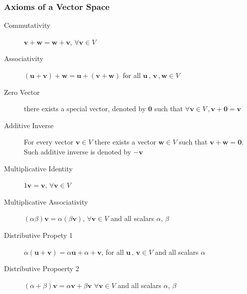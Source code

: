 \documentclass[12pt letter]{report}
\begin{document}
\subsubsection{Axioms of a Vector Space}

\begin{description}
  \item[Commutativity] $\mathbf{v} + \mathbf{w} = \mathbf{w} + \mathbf{v} $, $\forall \mathbf{v} \in V$
  \item[Associativity] $\left( \mathbf{u} + \mathbf{v} \right) + \mathbf{w} = \mathbf{u} + \left( \mathbf{v} +
          \mathbf{w}  \right)  $ for all $\mathbf{u}\, , \, \mathbf{v}\, , \mathbf{w} \in V$
  \item[Zero Vector] there exists a special vector, denoted by $\mathbf{0}$ such that $\forall \mathbf{v} \in V\, ,
          \mathbf{v} + \mathbf{0} = \mathbf{v} $
  \item[Additive Inverse] For every vector $\mathbf{v} \in V$ there exists a vector $\mathbf{w} \in V$ such that
        $\mathbf{v} + \mathbf{w} = \mathbf{0}$. Such additive inverse is denoted by $-\mathbf{v}$
  \item[Multiplicative Identity] $1\mathbf{v} = \mathbf{v}$, $\forall \mathbf{v} \in V$
  \item[Multiplicative Associativity] $\left( \alpha \beta \right) \mathbf{v} = \alpha \left( \beta\mathbf{v} \right)$,
        $\forall \mathbf{v} \in V$ and all scalars $\alpha$, $\beta$
  \item[Distributive Propety 1] $\alpha \left( \mathbf{u} + \mathbf{v} \right) = \alpha \mathbf{u} + \alpha +
          \mathbf{v}$, for all $\mathbf{u}\, , \, \mathbf{v} \in V$ and all scalars $\alpha$
  \item[Distributive Propoerty 2] $\left( \alpha + \beta \right)\mathbf{v} = \alpha\mathbf{v} + \beta\mathbf{v} $
        $\forall \mathbf{v} \in V$ and all scalars $\alpha$, $\beta$
\end{description}
\end{document}
